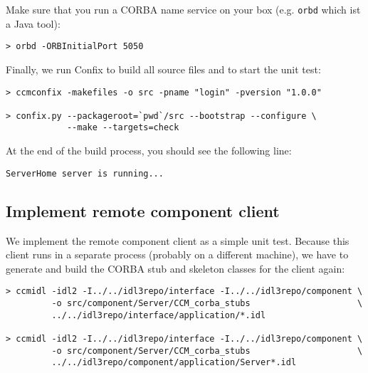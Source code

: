 \vspace{3mm}
Make sure that you run a CORBA name service on your box (e.g. {\tt orbd} which 
ist a Java tool):
\begin{footnotesize}
\begin{verbatim}
> orbd -ORBInitialPort 5050
\end{verbatim}
\end{footnotesize}

Finally, we run Confix to build all source files and to start the unit test:
\begin{footnotesize}
\begin{verbatim}
> ccmconfix -makefiles -o src -pname "login" -pversion "1.0.0"

> confix.py --packageroot=`pwd`/src --bootstrap --configure \
            --make --targets=check
\end{verbatim}
\end{footnotesize}

At the end of the build process, you should see the following line:
\begin{footnotesize}
\begin{verbatim}
ServerHome server is running...
\end{verbatim}
\end{footnotesize}


\subsection{Implement remote component client}
\label{subsection:ImplementRemoteComponentClient}

We implement the remote component client as a simple unit test.
Because this client runs in a separate process (probably on a different machine), we
have to generate and build the CORBA stub and skeleton classes for the client 
again:
\begin{footnotesize}
\begin{verbatim}
> ccmidl -idl2 -I../../idl3repo/interface -I../../idl3repo/component \
         -o src/component/Server/CCM_corba_stubs                     \  
         ../../idl3repo/interface/application/*.idl

> ccmidl -idl2 -I../../idl3repo/interface -I../../idl3repo/component \
         -o src/component/Server/CCM_corba_stubs                     \
         ../../idl3repo/component/application/Server*.idl
\end{verbatim}
\end{footnotesize}

